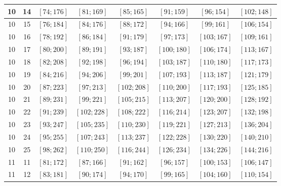 \documentclass[a4paper,12pt]{article}
\begin{document}
\begin{center}
{\begin{longtable}[H]{|c|c|c|c|c|c|c|c|}
10 &  14 &  $\left[ 74; 176\right]$ &  $\left[ 81; 169\right]$ &  $\left[ 85; 165\right]$ &  $\left[ 91; 159\right]$ &  $\left[ 96; 154\right]$ &  $\left[ 102; 148\right]$ \tabularnewline \hline
10 &  15 &  $\left[ 76; 184\right]$ &  $\left[ 84; 176\right]$ &  $\left[ 88; 172\right]$ &  $\left[ 94; 166\right]$ &  $\left[ 99; 161\right]$ &  $\left[ 106; 154\right]$ \tabularnewline \hline
10 &  16 &  $\left[ 78; 192\right]$ &  $\left[ 86; 184\right]$ &  $\left[ 91; 179\right]$ &  $\left[ 97; 173\right]$ &  $\left[ 103; 167\right]$ &  $\left[ 109; 161\right]$ \tabularnewline \hline
10 &  17 &  $\left[ 80; 200\right]$ &  $\left[ 89; 191\right]$ &  $\left[ 93; 187\right]$ &  $\left[ 100; 180\right]$ &  $\left[ 106; 174\right]$ &  $\left[ 113; 167\right]$ \tabularnewline \hline
10 &  18 &  $\left[ 82; 208\right]$ &  $\left[ 92; 198\right]$ &  $\left[ 96; 194\right]$ &  $\left[ 103; 187\right]$ &  $\left[ 110; 180\right]$ &  $\left[ 117; 173\right]$ \tabularnewline \hline
10 &  19 &  $\left[ 84; 216\right]$ &  $\left[ 94; 206\right]$ &  $\left[ 99; 201\right]$ &  $\left[ 107; 193\right]$ &  $\left[ 113; 187\right]$ &  $\left[ 121; 179\right]$ \tabularnewline \hline
10 &  20 &  $\left[ 87; 223\right]$ &  $\left[ 97; 213\right]$ &  $\left[ 102; 208\right]$ &  $\left[ 110; 200\right]$ &  $\left[ 117; 193\right]$ &  $\left[ 125; 185\right]$ \tabularnewline \hline
10 &  21 &  $\left[ 89; 231\right]$ &  $\left[ 99; 221\right]$ &  $\left[ 105; 215\right]$ &  $\left[ 113; 207\right]$ &  $\left[ 120; 200\right]$ &  $\left[ 128; 192\right]$ \tabularnewline \hline
10 &  22 &  $\left[ 91; 239\right]$ &  $\left[ 102; 228\right]$ &  $\left[ 108; 222\right]$ &  $\left[ 116; 214\right]$ &  $\left[ 123; 207\right]$ &  $\left[ 132; 198\right]$ \tabularnewline \hline
10 &  23 &  $\left[ 93; 247\right]$ &  $\left[ 105; 235\right]$ &  $\left[ 110; 230\right]$ &  $\left[ 119; 221\right]$ &  $\left[ 127; 213\right]$ &  $\left[ 136; 204\right]$ \tabularnewline \hline
10 &  24 &  $\left[ 95; 255\right]$ &  $\left[ 107; 243\right]$ &  $\left[ 113; 237\right]$ &  $\left[ 122; 228\right]$ &  $\left[ 130; 220\right]$ &  $\left[ 140; 210\right]$ \tabularnewline \hline
10 &  25 &  $\left[ 98; 262\right]$ &  $\left[ 110; 250\right]$ &  $\left[ 116; 244\right]$ &  $\left[ 126; 234\right]$ &  $\left[ 134; 226\right]$ &  $\left[ 144; 216\right]$ \tabularnewline \hline
11 &  11 &  $\left[ 81; 172\right]$ &  $\left[ 87; 166\right]$ &  $\left[ 91; 162\right]$ &  $\left[ 96; 157\right]$ &  $\left[ 100; 153\right]$ &  $\left[ 106; 147\right]$ \tabularnewline \hline
11 &  12 &  $\left[ 83; 181\right]$ &  $\left[ 90; 174\right]$ &  $\left[ 94; 170\right]$ &  $\left[ 99; 165\right]$ &  $\left[ 104; 160\right]$ &  $\left[ 110; 154\right]$ \tabularnewline \hline

\end{longtable}}
\end{center}
\end{document}
